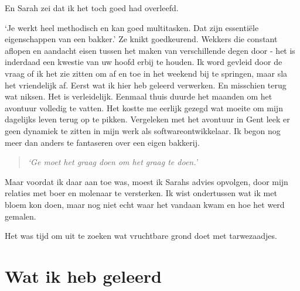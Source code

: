 \documentclass[
  11pt,
  dutch,
]{memoir}
\begin{document}
En Sarah zei dat ik het toch goed had overleefd.

`Je werkt heel methodisch en kan goed multitasken. Dat zijn essentiële
eigenschappen van een bakker.' Ze knikt goedkeurend. Wekkers die
constant aflopen en aandacht eisen tussen het maken van verschillende
degen door - het is inderdaad een kwestie van uw hoofd erbij te houden.
Ik word gevleid door de vraag of ik het zie zitten om af en toe in het
weekend bij te springen, maar sla het vriendelijk af. Eerst wat ik hier
heb geleerd verwerken. En misschien terug wat niksen. Het is
verleidelijk. Eenmaal thuis duurde het maanden om het avontuur volledig
te vatten. Het kostte me eerlijk gezegd wat moeite om mijn dagelijks
leven terug op te pikken. Vergeleken met het avontuur in Gent leek er
geen dynamiek te zitten in mijn werk als softwareontwikkelaar. Ik begon
nog meer dan anders te fantaseren over een eigen bakkerij.

\begin{quote}
\emph{`Ge moet het graag doen om het graag te doen.'}
\end{quote}

Maar voordat ik daar aan toe was, moest ik Sarahs advies opvolgen, door
mijn relaties met boer en molenaar te versterken. Ik wist ondertussen
wat ik met bloem kon doen, maar nog niet echt waar het vandaan kwam en
hoe het werd gemalen.

Het was tijd om uit te zoeken wat vruchtbare grond doet met
tarwezaadjes.

\newpage

\hypertarget{wat-ik-heb-geleerd-4}{%
\section{Wat ik heb geleerd}\label{wat-ik-heb-geleerd-4}}
\end{document}
